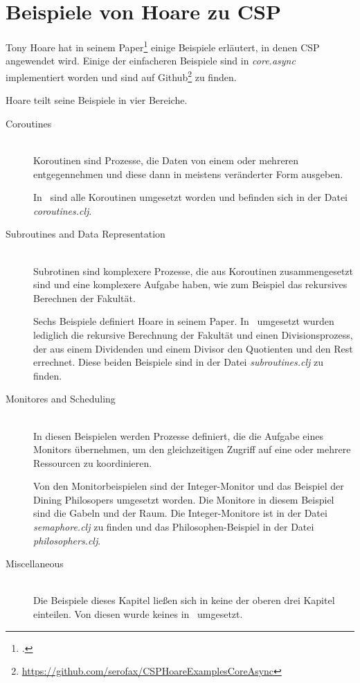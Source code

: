 \section{Beispiele von Hoare zu \acs{CSP}}
Tony Hoare hat in seinem Paper\footcite{CSP} einige Beispiele erläutert, in denen \ac{CSP} angewendet wird. Einige der einfacheren Beispiele sind in \textit{core.async} implementiert worden und sind auf Github\footnote{\url{https://github.com/serofax/CSPHoareExamplesCoreAsync}} zu finden.

Hoare teilt seine Beispiele in vier Bereiche. 

\begin{description}
\item[Coroutines]\hfill \\
Koroutinen sind Prozesse, die Daten von einem oder mehreren entgegennehmen und diese dann in meistens veränderter Form ausgeben.

In \CA\ sind alle Koroutinen umgesetzt worden und befinden sich in der Datei \textit{coroutines.clj}.
\item[Subroutines and Data Representation]\hfill \\
Subrotinen sind komplexere Prozesse, die aus Koroutinen zusammengesetzt sind und eine komplexere Aufgabe haben, wie zum Beispiel das rekursives Berechnen der Fakultät.

Sechs Beispiele definiert Hoare in seinem Paper. In \CA\ umgesetzt wurden lediglich die rekursive Berechnung der Fakultät und einen Divisionsprozess, der aus einem Dividenden und einem Divisor den Quotienten und den Rest errechnet. Diese beiden Beispiele sind in der Datei \textit{subroutines.clj} zu finden.
\item[Monitores and Scheduling] \hfill \\
In diesen Beispielen werden Prozesse definiert, die die Aufgabe eines Monitors übernehmen, um den gleichzeitigen Zugriff auf eine oder mehrere Ressourcen zu koordinieren.

Von den Monitorbeispielen sind der Integer-Monitor und das Beispiel der Dining Philosopers umgesetzt worden. Die Monitore in diesem Beispiel sind die Gabeln und der Raum. Die Integer-Monitore ist in der Datei \textit{semaphore.clj} zu finden und das Philosophen-Beispiel in der Datei \textit{philosophers.clj}.
\item[Miscellaneous] \hfill \\
Die Beispiele dieses Kapitel ließen sich in keine der oberen drei Kapitel einteilen. Von diesen wurde keines in \CA\ umgesetzt.
\end{description}




